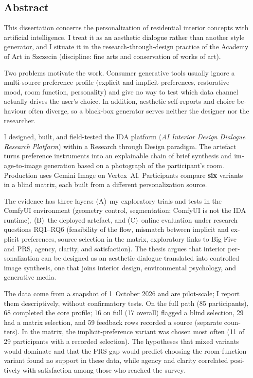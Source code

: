 \vspace{1.5em}
\begin{otherlanguage}{english}
\chapter*{Abstract}

This dissertation concerns the personalization of residential interior concepts with artificial intelligence. I treat it as an aesthetic dialogue rather than another style generator, and I situate it in the research-through-design practice of the Academy of Art in Szczecin (discipline: fine arts and conservation of works of art).

Two problems motivate the work. Consumer generative tools usually ignore a multi-source preference profile (explicit and implicit preferences, restorative mood, room function, personality) and give no way to test which data channel actually drives the user's choice. In addition, aesthetic self-reports and choice behaviour often diverge, so a black-box generator serves neither the designer nor the researcher.

I designed, built, and field-tested the IDA platform (\emph{AI Interior Design Dialogue Research Platform}) within a Research through Design paradigm. The artefact turns preference instruments into an explainable chain of brief synthesis and image-to-image generation based on a photograph of the participant's room. Production uses Gemini Image on Vertex~AI. Participants compare \textbf{six} variants in a blind matrix, each built from a different personalization source.

The evidence has three layers: (A)~my exploratory trials and tests in the ComfyUI environment (geometry control, segmentation; ComfyUI is not the IDA runtime), (B)~the deployed artefact, and (C)~online evaluation under research questions RQ1--RQ6 (feasibility of the flow, mismatch between implicit and explicit preferences, source selection in the matrix, exploratory links to Big Five and PRS, agency, clarity, and satisfaction). The thesis argues that interior personalization can be designed as an aesthetic dialogue translated into controlled image synthesis, one that joins interior design, environmental psychology, and generative media.

The data come from a snapshot of 1~October 2026 and are pilot-scale; I report them descriptively, without confirmatory tests. On the full path (85 participants), 68 completed the core profile; 16 on full (17 overall) flagged a blind selection, 29 had a matrix selection, and 59 feedback rows recorded a source (separate counters). In the matrix, the implicit-preference variant was chosen most often (11 of 29 participants with a recorded selection). The hypotheses that mixed variants would dominate and that the PRS gap would predict choosing the room-function variant found no support in these data, while agency and clarity correlated positively with satisfaction among those who reached the survey.
\end{otherlanguage}
